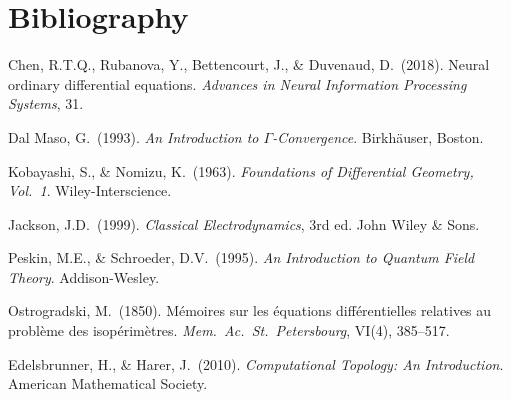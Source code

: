 \documentclass[12pt, a4paper]{article}
\theoremstyle{plain}
\theoremstyle{definition}
\theoremstyle{remark}
\begin{document}
\section*{Bibliography}

\begin{enumerate}[label={[\arabic*]}]
  \item Chen, R.T.Q., Rubanova, Y., Bettencourt, J., \& Duvenaud, D.~(2018). Neural ordinary differential equations. \textit{Advances in Neural Information Processing Systems}, 31.
  \item Dal Maso, G.~(1993). \textit{An Introduction to $\Gamma$-Convergence}. Birkhäuser, Boston.
  \item Kobayashi, S., \& Nomizu, K.~(1963). \textit{Foundations of Differential Geometry, Vol.~1}. Wiley-Interscience.
  \item Jackson, J.D.~(1999). \textit{Classical Electrodynamics}, 3rd ed. John Wiley \& Sons.
  \item Peskin, M.E., \& Schroeder, D.V.~(1995). \textit{An Introduction to Quantum Field Theory}. Addison-Wesley.
  \item Ostrogradski, M.~(1850). Mémoires sur les équations différentielles relatives au problème des isopérimètres. \textit{Mem.\ Ac.\ St.\ Petersbourg}, VI(4), 385–517.
  \item Edelsbrunner, H., \& Harer, J.~(2010). \textit{Computational Topology: An Introduction}. American Mathematical Society.
\end{enumerate}
\end{document}
